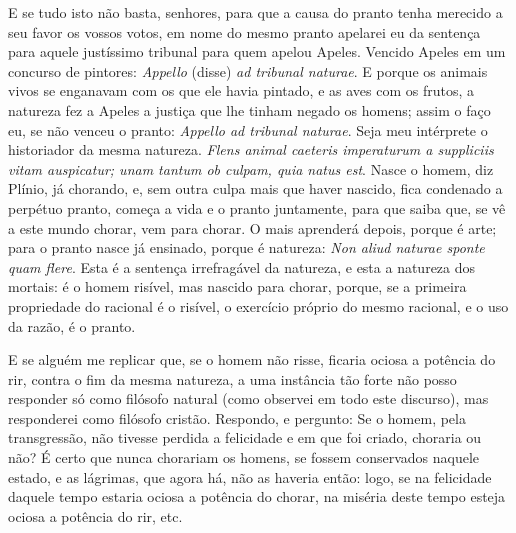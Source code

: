 E se tudo isto não basta, senhores, para que a causa do pranto tenha
merecido a seu favor os vossos votos, em nome do mesmo pranto apelarei
eu da sentença para aquele justíssimo tribunal para quem apelou Apeles.
Vencido Apeles em um concurso de pintores: \emph{Appello} (disse) \emph{ad
tribunal naturae}. E porque os animais vivos se enganavam com os que
ele havia pintado, e as aves com os frutos, a natureza fez a Apeles a
justiça que lhe tinham negado os homens; assim o faço eu, se não venceu
o pranto: \emph{Appello ad tribunal naturae}. Seja meu intérprete o
historiador da mesma natureza.
\emph{Flens animal caeteris imperaturum a suppliciis vitam auspicatur;
unam tantum ob culpam, quia natus est}. Nasce
o homem, diz Plínio, já chorando, e, sem outra culpa mais que haver
nascido, fica condenado a perpétuo pranto, começa a vida e o pranto
juntamente, para que saiba que, se vê a este mundo chorar, vem para
chorar.
O mais aprenderá depois, porque é arte; para o pranto nasce já
ensinado, porque é natureza: \emph{Non aliud naturae sponte quam flere}.
Esta é a sentença irrefragável da natureza, e esta a natureza dos
mortais: é o homem risível, mas nascido para chorar,
porque, se a primeira propriedade do racional é o risível, o exercício
próprio do mesmo racional, e o uso da razão, é o pranto.

E se alguém me replicar que, se o homem não risse, ficaria ociosa a
potência do rir, contra o fim da mesma natureza, a uma instância tão
forte não posso responder só como filósofo natural (como observei em
todo este discurso), mas responderei como filósofo cristão. Respondo, e
pergunto: Se o homem, pela transgressão, não tivesse perdida a
felicidade e em que foi criado, choraria ou não? É certo que nunca
chorariam os homens, se fossem conservados naquele estado, e as
lágrimas, que agora há, não as haveria então: logo, se na felicidade
daquele tempo estaria ociosa a potência do chorar, na miséria deste
tempo esteja ociosa a potência do rir, etc.

